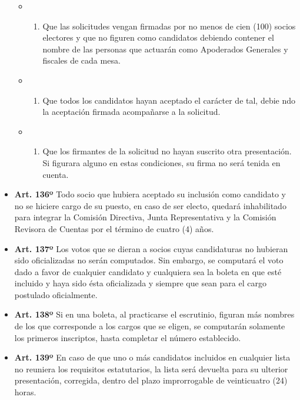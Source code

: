 \documentclass[]{book}
\providecommand{\tightlist}{%
  \setlength{\itemsep}{0pt}\setlength{\parskip}{0pt}}
\begin{document}
\begin{itemize}
  \begin{itemize}
  \item
    \begin{enumerate}
    \def\labelenumi{\alph{enumi})}
    \tightlist
    \item
      Que las solicitudes vengan firmadas por no menos de cien (100)
      socios electores y que no figuren como candidatos debiendo
      contener el nombre de las personas que actuarán como Apoderados
      Generales y fiscales de cada mesa.
    \end{enumerate}
  \item
    \begin{enumerate}
    \def\labelenumi{\alph{enumi})}
    \setcounter{enumi}{1}
    \tightlist
    \item
      Que todos los candidatos hayan aceptado el carácter de tal, debie
      ndo la aceptación firmada acompañarse a la solicitud.
    \end{enumerate}
  \item
    \begin{enumerate}
    \def\labelenumi{\alph{enumi})}
    \setcounter{enumi}{2}
    \tightlist
    \item
      Que los firmantes de la solicitud no hayan suscrito otra
      presentación. Si figurara alguno en estas condiciones, su firma no
      será tenida en cuenta.
    \end{enumerate}
  \end{itemize}
\item
  \textbf{Art. 136º} Todo socio que hubiera aceptado su inclusión como
  candidato y no se hiciere cargo de su puesto, en caso de ser electo,
  quedará inhabilitado para integrar la Comisión Directiva, Junta
  Representativa y la Comisión Revisora de Cuentas por el término de
  cuatro (4) años.
\item
  \textbf{Art. 137º} Los votos que se dieran a socios cuyas candidaturas
  no hubieran sido oficializadas no serán computados. Sin embargo, se
  computará el voto dado a favor de cualquier candidato y cualquiera sea
  la boleta en que esté incluido y haya sido ésta oficializada y siempre
  que sean para el cargo postulado oficialmente.
\item
  \textbf{Art. 138º} Si en una boleta, al practicarse el escrutinio,
  figuran más nombres de los que corresponde a los cargos que se eligen,
  se computarán solamente los primeros inscriptos, hasta completar el
  número establecido.
\item
  \textbf{Art. 139º} En caso de que uno o más candidatos incluidos en
  cualquier lista no reuniera los requisitos estatutarios, la lista será
  devuelta para su ulterior presentación, corregida, dentro del plazo
  improrrogable de veinticuatro (24) horas.
\end{itemize}
\end{document}
